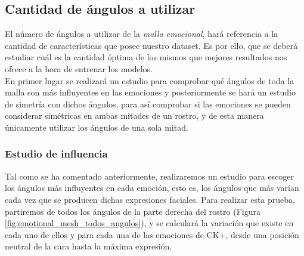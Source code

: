 \subsection{Cantidad de ángulos a utilizar}
\label{sec:cantidad_de_angulos}

El número de ángulos a utilizar de la \textit{malla emocional}, hará referencia a la cantidad de características que posee nuestro dataset. Es por ello, que se deberá estudiar cuál es la cantidad óptima de los mismos que mejores resultados nos ofrece a la hora de entrenar los modelos.\\

En primer lugar se realizará un estudio para comprobar qué ángulos de toda la malla son más influyentes en las emociones y posteriormente se hará un estudio de simetría con dichos ángulos, para así comprobar si las emociones se pueden considerar simétricas en ambas mitades de un rostro, y de esta manera únicamente utilizar los ángulos de una sola mitad.

\subsubsection{Estudio de influencia}

Tal como se ha comentado anteriormente, realizaremos un estudio para escoger los ángulos más influyentes en cada emoción, esto es, los ángulos que más varían cada vez que se producen dichas expresiones faciales. Para realizar esta prueba, partiremos de todos los ángulos de la parte derecha del rostro (Figura \ref{fig:emotional_mesh_todos_angulos}), y se calculará la variación que existe en cada uno de ellos y para cada una de las emociones de CK+, desde una posición neutral de la cara hasta la máxima expresión.\\

